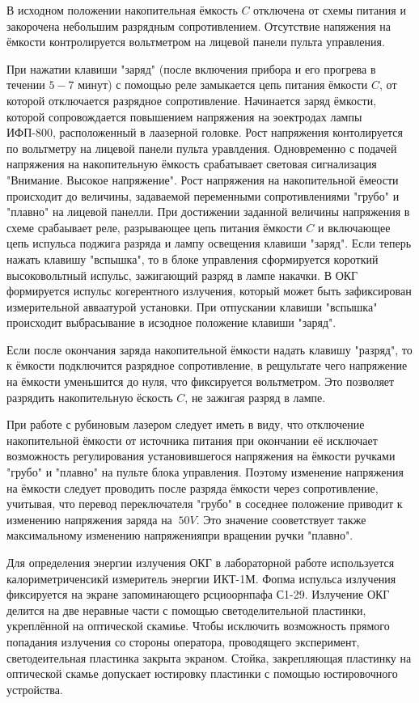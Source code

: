 \documentclass[a4paper,14pt,russian]{article}
\begin{document}
В исходном положении накопительная ёмкость $C$ отключена от схемы питания и закорочена небольшим разрядным сопротивлением. Отсутствие напяжения на ёмкости контролируется вольтметром на лицевой панели пульта управления.

При нажатии клавиши "заряд" (после включения прибора и его прогрева в течении $5-7$ минут) с помощью реле замыкается цепь питания ёмкости $C$, от которой отключается разрядное сопротивление. Начинается заряд ёмкости, которой сопровождается повышением напряжения на эоектродах лампы ИФП-800, расположенный в лаазерной головке. Рост напряжения контолируется по вольтметру на лицевой панели пульта уравлдения. Одновременно с подачей напряжения на накопительную ёмкость срабатывает световая сигнализация "Внимание. Высокое напряжение". Рост напряжения на накопительной ёмеости происходит до величины, задаваемой переменными сопротивлениями "грубо" и "плавно" на лицевой панелли. При достижении заданной величины напряжения в схеме срабаывает реле, разрывающее цепь питания ёмкости $C$ и включающее цепь испульса поджига разряда и лампу освещения клавиши "заряд". Если теперь нажать клавишу "вспышка", то в блоке управления сформируется короткий высоковольтный испульс, зажигающий разряд в лампе накачки. В ОКГ формируется испульс когерентного излучения, который может быть зафиксирован измерительной авваатурой установки. При отпускании клавиши "вспышка" происходит выбрасывание в исзодное положение клавиши "заряд".

Если после окончания заряда накопительной ёмкости надать клавишу "разряд", то к ёмкости подключится разрядное сопротивление, в рещультате чего напряжение на ёмкости уменьшится до нуля, что фиксируется вольтметром. Это позволяет разрядить накопительную ёскость $C$, не зажигая разряд в лампе.

При работе с рубиновым лазером следует иметь в виду, что отключение накопительной ёмкости от источника питания при окончании её исключает возможность регулирования установившегося напряжения на ёмкости ручками "грубо" и "плавно" на пульте блока управления. Поэтому изменение напряжения на ёмкости следует проводить после разряда ёмкости через сопротивление, учитывая, что перевод переключателя "грубо" в соседнее положение приводит к изменению напряжения заряда на $~ 50 V$. Это значение сооветствует также максимальному изменению напряженияпри вращении ручки "плавно".

Для определения энергии излучения ОКГ в лабораторной работе используется калориметриченсикй измеритель энергии ИКТ-1М. Фопма испульса излучения фиксируется на экране запоминающего рсциоорнпафа С1-29. Излучение ОКГ делится на две неравные части с помощью светоделительной пластинки, укреплённой на оптической скамиье. Чтобы исключить возможность прямого попадания излучения со стороны оператора, проводящего эксперимент, светодеительная пластинка закрыта экраном. Стойка, закрепляющая пластинку на оптической скамье допускает юстировку пластинки с помощью юстировочного устройства.
\end{document}
